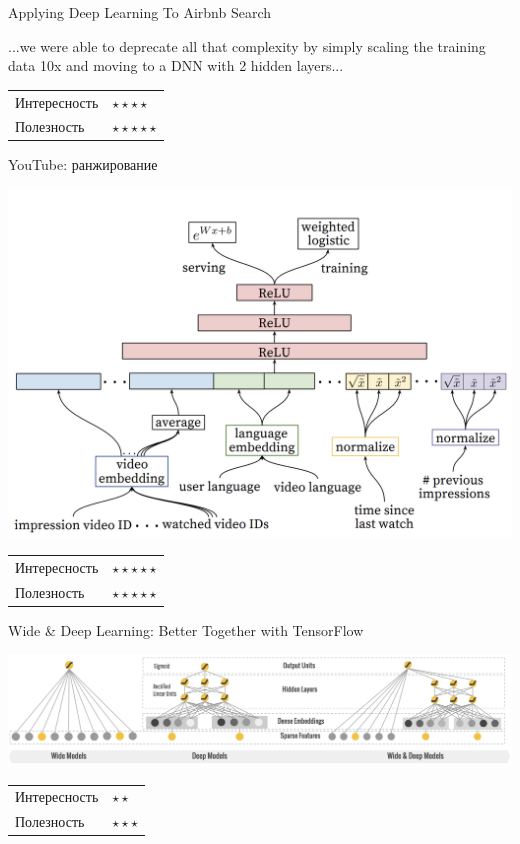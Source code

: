 \documentclass[11pt,aspectratio=169]{beamer}
\begin{document}
\begin{frame}{Applying Deep Learning To Airbnb Search \cite{AIRBNB}}
\begin{tcolorbox}[colback=info!5,colframe=info!80,title=]
...we were able to deprecate all that complexity by simply scaling the training data 10x and moving to a DNN with 2 hidden layers...
\end{tcolorbox}

\begin{tabular}{l l}
Интересность & $\star\star\star\star$ \\
Полезность & $\star\star\star\star\star$
\end{tabular}

\end{frame}

\begin{frame}{YouTube: ранжирование}

\begin{center}
\includegraphics[scale=0.3]{images/youtube-rank.png}
\end{center}

\begin{tabular}{l l}
Интересность & $\star\star\star\star\star$ \\
Полезность & $\star\star\star\star\star$
\end{tabular}

\end{frame}

\begin{frame}{Wide \& Deep Learning: Better Together with TensorFlow \cite{WD}}

\begin{center}
\includegraphics[scale=0.25]{images/widedeep.png}
\end{center}

\begin{tabular}{l l}
Интересность & $\star\star$ \\
Полезность & $\star\star\star$
\end{tabular}

\end{frame}
\end{document}
